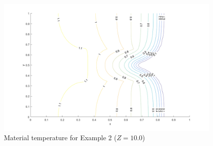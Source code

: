 \documentclass[11pt]{scrartcl}
\begin{document}
\begin{figure}[htpb!]
\centering
\includegraphics[width=\linewidth]{Example2_2.png}
\caption{Material temperature for Example 2 ($Z=10.0$)}
\label{fig:ex2_2}
\end{figure}


\newpage



\end{document}
